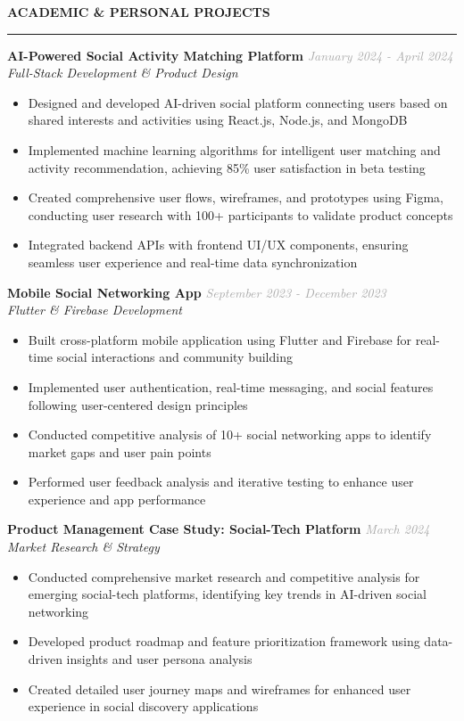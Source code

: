 \documentclass[11pt,a4paper]{article}
\newcommand{\resumesection}[1]{
    \vspace{8pt}
    \textcolor{primarycolor}{\textbf{\Large #1}}
    \vspace{2pt}
    \hrule
    \vspace{6pt}
}
\newcommand{\resumeproject}[3]{
    \textbf{#1} \hfill \textcolor{darkgray}{\textit{#2}} \\
    \textit{#3} \\
    \vspace{2pt}
}
\begin{document}
\resumesection{ACADEMIC \& PERSONAL PROJECTS}

\resumeproject{AI-Powered Social Activity Matching Platform}{January 2024 - April 2024}{Full-Stack Development \& Product Design}
\begin{itemize}[leftmargin=15pt, itemsep=2pt]
    \item Designed and developed AI-driven social platform connecting users based on shared interests and activities using React.js, Node.js, and MongoDB
    \item Implemented machine learning algorithms for intelligent user matching and activity recommendation, achieving 85\% user satisfaction in beta testing
    \item Created comprehensive user flows, wireframes, and prototypes using Figma, conducting user research with 100+ participants to validate product concepts
    \item Integrated backend APIs with frontend UI/UX components, ensuring seamless user experience and real-time data synchronization
\end{itemize}

\resumeproject{Mobile Social Networking App}{September 2023 - December 2023}{Flutter \& Firebase Development}
\begin{itemize}[leftmargin=15pt, itemsep=2pt]
    \item Built cross-platform mobile application using Flutter and Firebase for real-time social interactions and community building
    \item Implemented user authentication, real-time messaging, and social features following user-centered design principles
    \item Conducted competitive analysis of 10+ social networking apps to identify market gaps and user pain points
    \item Performed user feedback analysis and iterative testing to enhance user experience and app performance
\end{itemize}

\resumeproject{Product Management Case Study: Social-Tech Platform}{March 2024}{Market Research \& Strategy}
\begin{itemize}[leftmargin=15pt, itemsep=2pt]
    \item Conducted comprehensive market research and competitive analysis for emerging social-tech platforms, identifying key trends in AI-driven social networking
    \item Developed product roadmap and feature prioritization framework using data-driven insights and user persona analysis
    \item Created detailed user journey maps and wireframes for enhanced user experience in social discovery applications
\end{itemize}
\end{document}
